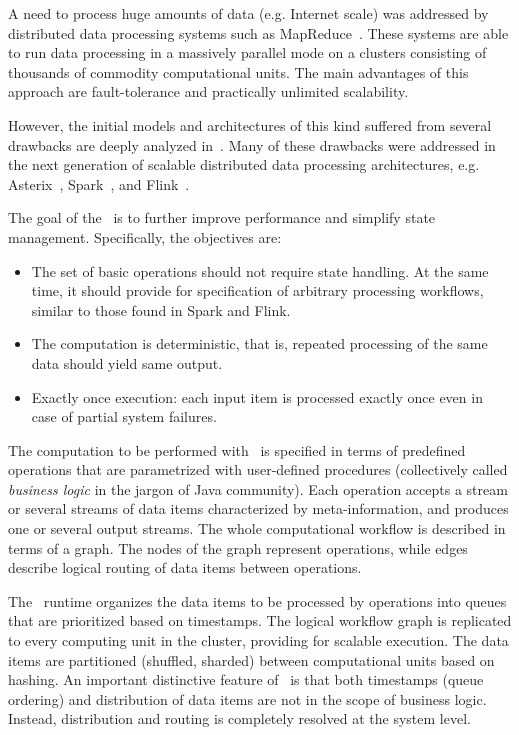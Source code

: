 
\label {fs-intro-seciton}

A need to process huge amounts of data (e.g. Internet scale) was addressed by distributed data processing systems such as MapReduce~\cite{Dean:2008:MSD:1327452.1327492}. These systems are able to run data processing in a massively parallel mode on a clusters consisting of thousands of commodity computational units. The main advantages of this approach are fault-tolerance and practically unlimited scalability.

However, the initial models and architectures of this kind suffered from several drawbacks are deeply analyzed in~\cite{Doulkeridis:2014:SLA:2628707.2628782}. 
Many of these drawbacks were addressed in the next generation of scalable distributed data processing architectures, e.g. 
Asterix~\cite{Alsubaiee:2012:ASW:2331801.2331803}, 
Spark~\cite{Zaharia:2016:ASU:3013530.2934664,Franklin:2015:MSB:2684822.2685326}, 
and Flink~\cite{Carbone:2017:SMA:3137765.3137777}. 

The goal of the \FlameStream ~is to further improve performance and simplify state management. Specifically, the objectives are:

\begin {itemize}
\item The set of basic operations should not require state handling. At the same time, it should provide for specification of arbitrary processing workflows, similar to those found in Spark and Flink. 
\item The computation is deterministic, that is, repeated processing of the same data should yield same output.
\item Exactly once execution: each input item is processed exactly once even in case of partial system failures. 
\end {itemize}

The computation to be performed with \FlameStream ~is specified in terms of predefined operations that are parametrized with user-defined procedures (collectively called {\em business logic} in the jargon of Java community). Each operation accepts a stream or several streams of data items characterized by meta-information, and produces one or several output streams. The whole computational workflow is described in terms of a graph. The nodes of the graph represent operations, while edges describe logical routing of data items between operations.

The \FlameStream ~runtime organizes the data items to be processed by operations into queues that are prioritized based on timestamps. The logical workflow graph is replicated to every computing unit in the cluster, providing for scalable execution. The data items are partitioned (shuffled, sharded) between computational units based on hashing. An important distinctive feature of \FlameStream ~is that both timestamps (queue ordering) and distribution of data items are not in the scope of business logic. Instead, distribution and routing is completely resolved at the system level.

